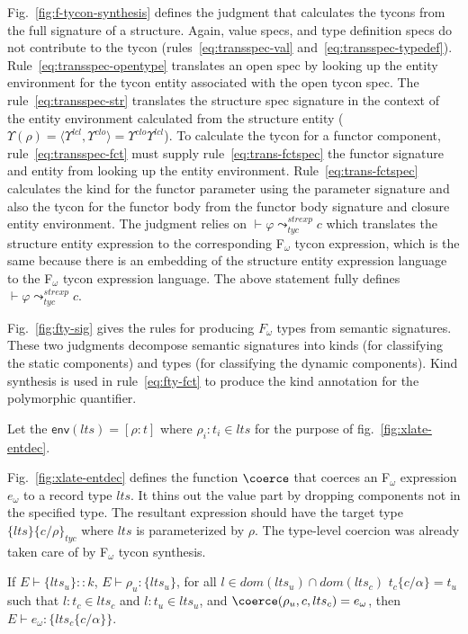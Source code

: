 Fig.~\ref{fig:f-tycon-synthesis} defines the judgment
that calculates the tycons from the full signature of a
structure. Again, value specs, and type definition specs do not
contribute to the tycon (rules~\ref{eq:transspec-val} and~\ref{eq:transspec-typedef}). Rule~\ref{eq:transspec-opentype} translates
an open spec by
looking up the entity environment for the tycon entity associated with
the open tycon spec. The rule~\ref{eq:transspec-str} translates the
structure spec signature in the context of the entity environment
calculated from the structure entity
($\Upsilon(\rho)=\langle\Upsilon^{lcl},\Upsilon^{clo}\rangle=\Upsilon^{clo}\Upsilon^{lcl}$).
To calculate the tycon for a functor component,
rule~\ref{eq:transspec-fct} must supply rule~\ref{eq:trans-fctspec}
the functor signature and entity from looking up the entity
environment. Rule~\ref{eq:trans-fctspec} calculates the kind for the
functor parameter using the parameter signature and also the tycon for
the functor body from the functor body signature and closure entity
environment. The judgment relies on $\vdash \varphi
\leadsto^{strexp}_{tyc} c$ which translates the structure entity
expression to the corresponding F$_\omega$ tycon expression, which is
the same because there is an embedding of the structure entity
expression language to the F$_\omega$ tycon expression language. The
above statement fully defines $\vdash \varphi
\leadsto^{strexp}_{tyc} c$. 

Fig.~\ref{fig:fty-sig} gives the rules
for producing $F_\omega$ types from semantic signatures. These two
judgments decompose semantic signatures into kinds (for classifying
the static components) and types (for classifying the dynamic
components). Kind synthesis is used in rule~\ref{eq:fty-fct} to
produce the kind annotation for the polymorphic quantifier. 

Let the $\mathsf{env}(lts) = [\rho:t]$ where $\rho_i:t_i \in lts$ for the purpose of fig.~\ref{fig:xlate-entdec}. 
  

    
Fig.~\ref{fig:xlate-entdec} defines the function $\coerce$ that
coerces an F$_\omega$ expression $e_\omega$ to a record type $lts$. 
It thins out the value part by dropping components not
in the specified type. The resultant expression should have the target
type $\{lts\}\{c/\rho\}_{tyc}$ where $lts$ is parameterized by
$\rho$. The type-level coercion was already taken care of by
F$_\omega$ tycon synthesis. 

\begin{lemma}
If $E\vdash \{lts_u\}::k$, $E\vdash
\rho_u : \{lts_u\}$, for all $l\in dom(lts_u)\cap dom(lts_c)$
$t_c\{c/\alpha\}=t_u$ such that $l:t_c \in lts_c$ and $l:t_u \in lts_u$, and
 $\coerce(\rho_u,c,lts_c) = e_\omega$, then $E\vdash e_\omega : \{lts_c\{c/\alpha\}\}$. 
\end{lemma}

